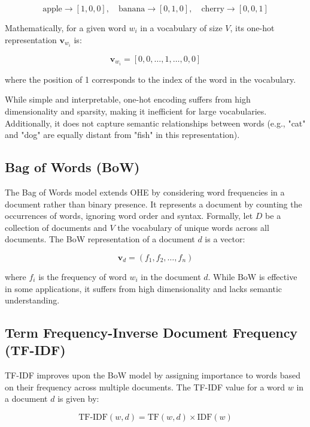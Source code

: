 \[
\text{apple} \rightarrow [1, 0, 0], \quad
\text{banana} \rightarrow [0, 1, 0], \quad
\text{cherry} \rightarrow [0, 0, 1]
\]

Mathematically, for a given word \( w_i \) in a vocabulary of size \( V \), its one-hot representation \( \mathbf{v}_{w_i} \) is:

\begin{equation}
    \mathbf{v}_{w_i} = [0, 0, \dots, 1, \dots, 0, 0]
\end{equation}

where the position of 1 corresponds to the index of the word in the vocabulary.

While simple and interpretable, one-hot encoding suffers from high dimensionality and sparsity, making it inefficient for large vocabularies. Additionally, it does not capture semantic relationships between words (e.g., "cat" and "dog" are equally distant from "fish" in this representation).

\subsection{Bag of Words (BoW)}

The Bag of Words model extends OHE by considering word frequencies in a document rather than binary presence. It represents a document by counting the occurrences of words, ignoring word order and syntax. Formally, let \( D \) be a collection of documents and \( V \) the vocabulary of unique words across all documents. The BoW representation of a document \( d \) is a vector:

\begin{equation}
    \mathbf{v}_d = (f_1, f_2, \dots, f_n)
\end{equation}

where \( f_i \) is the frequency of word \( w_i \) in the document \( d \). While BoW is effective in some applications, it suffers from high dimensionality and lacks semantic understanding.

\subsection{Term Frequency-Inverse Document Frequency (TF-IDF)}

TF-IDF improves upon the BoW model by assigning importance to words based on their frequency across multiple documents. The TF-IDF value for a word \( w \) in a document \( d \) is given by:

\begin{equation}
    \text{TF-IDF}(w, d) = \text{TF}(w, d) \times \text{IDF}(w)
\end{equation}

